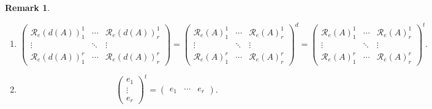 \documentclass[aps,preprint]{revtex4}
\newtheorem{remark}[theorem]{Remark}
\begin{document}
\begin{remark}
\begin{enumerate}
\item 
\begin{equation}
\left( 
\begin{array}{ccc}
\mathcal{R}_{e}\left( d\left( A\right) \right) _{1}^{1} & \cdots & \mathcal{R%
}_{e}\left( d\left( A\right) \right) _{r}^{1} \\ 
\vdots & \ddots & \vdots \\ 
\mathcal{R}_{e}\left( d\left( A\right) \right) _{1}^{r} & \cdots & \mathcal{R%
}_{e}\left( d\left( A\right) \right) _{r}^{r}%
\end{array}%
\right) =\left( 
\begin{array}{ccc}
\mathcal{R}_{e}\left( A\right) _{1}^{1} & \cdots & \mathcal{R}_{e}\left(
A\right) _{r}^{1} \\ 
\vdots & \ddots & \vdots \\ 
\mathcal{R}_{e}\left( A\right) _{1}^{r} & \cdots & \mathcal{R}_{e}\left(
A\right) _{r}^{r}%
\end{array}%
\right) ^{d}=\left( 
\begin{array}{ccc}
\mathcal{R}_{e}\left( A\right) _{1}^{1} & \cdots & \mathcal{R}_{e}\left(
A\right) _{r}^{1} \\ 
\vdots & \ddots & \vdots \\ 
\mathcal{R}_{e}\left( A\right) _{1}^{r} & \cdots & \mathcal{R}_{e}\left(
A\right) _{r}^{r}%
\end{array}%
\right) ^{t}.
\end{equation}

\item 
\begin{equation}
\left( 
\begin{array}{c}
e_{1} \\ 
\vdots \\ 
e_{r}%
\end{array}%
\right) ^{t}=\left( 
\begin{array}{ccc}
e_{1} & \cdots & e_{r}%
\end{array}%
\right) .
\end{equation}
\end{enumerate}
\end{remark}
\end{document}
